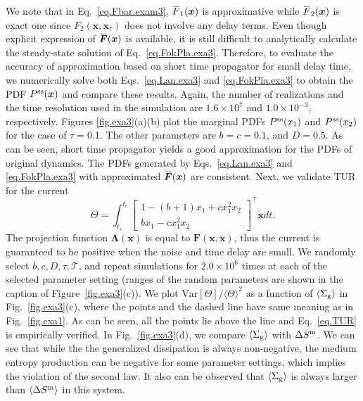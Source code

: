 \documentclass[pre,
twocolumn,
]{revtex4-1}
\newcommand{\overbar}[1]{\mkern 1.5mu\overline{\mkern-1.5mu#1\mkern-1.5mu}\mkern 1.5mu}
\theoremstyle{definition}
\theoremstyle{definition}
\newcommand{\bol}{\boldsymbol}
\newcommand{\mca}{\mathcal}
\newcommand{\mrm}{\mathrm}
\newcommand{\eq}[1]{\begin{equation}#1\end{equation}}
\newcommand{\avg}[1]{\langle #1\rangle}
\newcommand{\inl}[1]{$ #1 $}
\begin{document}
We note that in Eq.~\eqref{eq.Fbar.exam3}, \inl{\overbar{F}_1(\bol{x})} is approximative while \inl{\overbar{F}_2(\bol{x})} is exact one since \inl{F_2(\bol{x},\bol{x}_\tau)} does not involve any delay terms.
Even though explicit expression of \inl{\overbar{\bol{F}}(\bol{x})} is available, it is still difficult to analytically calculate the steady-state solution of Eq.~\eqref{eq.FokPla.exa3}.
Therefore, to evaluate the accuracy of approximation based on short time propagator for small delay time, we numerically solve both Eqs.~\eqref{eq.Lan.exa3} and \eqref{eq.FokPla.exa3} to obtain the PDF \inl{P^{\rm ss}(\bol{x})} and compare these results.
Again, the number of realizations and the time resolution used in the simulation are \inl{1.6\times 10^7} and \inl{1.0\times 10^{-3}}, respectively.
Figures \ref{fig.exa3}(a)(b) plot the marginal PDFs \inl{P^{\rm ss}(x_1)} and \inl{P^{\rm ss}(x_2)} for the case of \inl{\tau=0.1}.
The other parameters are \inl{b=c=0.1}, and \inl{D=0.5}.
As can be seen, short time propagator yields a good approximation for the PDFs of original dynamics.
The PDFs generated by Eqs.~\eqref{eq.Lan.exa3} and \eqref{eq.FokPla.exa3} with approximated \inl{\overbar{\bol{F}}(\bol{x})} are consistent.
Next, we validate TUR for the current 
\eq{
\Theta=\int_{t_s}^{t_e}\begin{bmatrix}
1-(b+1)x_1+cx_{1}^2x_{2}\\
bx_1-cx_1^2x_2
\end{bmatrix}^\top\dot{\bol{x}}dt.
}
The projection function \inl{\bol{\Lambda}(\bol{x})} is equal to \inl{\bol{F}(\bol{x},\bol{x})}, thus the current is guaranteed to be positive when the noise and time delay are small. 
We randomly select \inl{b,c,D,\tau,\mca{T}}, and repeat simulations for \inl{2.0\times 10^6} times at each of the selected parameter setting (ranges of the random parameters are shown in the caption
of Figure~\ref{fig.exa3}(c)).
We plot \inl{\mrm{Var}[\Theta]/\avg{\Theta}^2} as a function of \inl{\avg{\Sigma_{\rm g}}} in Fig.~\ref{fig.exa3}(c), where the points and the dashed line have same meaning as in Fig.~\ref{fig.exa1}.
As can be seen, all the points lie above the line and Eq.~\eqref{eq.TUR} is empirically verified.
In Fig.~\ref{fig.exa3}(d), we compare \inl{\avg{\Sigma_{\rm g}}} with \inl{\Delta S^{\rm m}}.
We can see that while the the generalized dissipation is always non-negative, the medium entropy production can be negative for some parameter settings, which implies the violation of the second law.
It also can be observed that \inl{\avg{\Sigma_{\rm g}}} is always larger than \inl{\avg{\Delta S^{\rm m}}} in this system.
\end{document}
